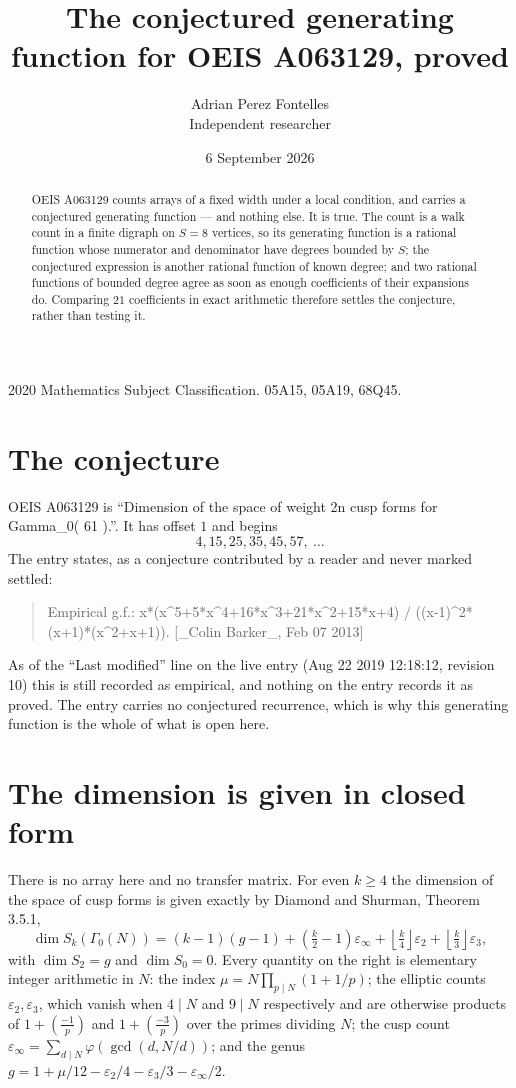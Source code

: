 \documentclass[11pt,a4paper]{article}
\title{The conjectured generating function for OEIS A063129, proved}
\author{Adrian Perez Fontelles\\ \small Independent researcher}
\date{6 September 2026}
\theoremstyle{plain}
\theoremstyle{definition}
\begin{document}
\maketitle

\begin{abstract}
OEIS A063129 counts arrays of a fixed width under a local condition, and carries a conjectured
generating function --- and nothing else. It is true. The count is a walk count in a finite
digraph on $S=8$ vertices, so its generating function is a rational function whose numerator
and denominator have degrees bounded by $S$; the conjectured expression is another rational
function of known degree; and two rational functions of bounded degree agree as soon as enough
coefficients of their expansions do. Comparing $21$ coefficients in exact arithmetic
therefore settles the conjecture, rather than testing it.
\end{abstract}

\noindent\small 2020 Mathematics Subject Classification. 05A15, 05A19, 68Q45.\normalsize

\section{The conjecture}

OEIS A063129 is ``Dimension of the space of weight 2n cusp forms for Gamma\_0( 61 ).''. It has offset $1$ and begins
\[
4, 15, 25, 35, 45, 57,\ \dots
\]
The entry states, as a conjecture contributed by a reader and never marked settled:
\begin{quote}
Empirical g.f.: x*(x\^{}5+5*x\^{}4+16*x\^{}3+21*x\^{}2+15*x+4) / ((x-1)\^{}2*(x+1)*(x\^{}2+x+1)). [\_Colin Barker\_, Feb 07 2013]
\end{quote}
As of the ``Last modified'' line on the live entry (Aug 22 2019 12:18:12, revision 10) this is still
recorded as empirical, and nothing on the entry records it as proved. The entry carries no
conjectured recurrence, which is why this generating function is the whole of what is open
here.


\section{The dimension is given in closed form}

There is no array here and no transfer matrix. For even $k\ge4$ the dimension of the space of
cusp forms is given exactly by Diamond and Shurman, Theorem 3.5.1,
\[
\dim S_k(\Gamma_0(N))=(k-1)(g-1)+\left(\tfrac{k}{2}-1\right)\varepsilon_\infty
+\left\lfloor\tfrac{k}{4}\right\rfloor\varepsilon_2
+\left\lfloor\tfrac{k}{3}\right\rfloor\varepsilon_3 ,
\]
with $\dim S_2=g$ and $\dim S_0=0$. Every quantity on the right is elementary integer
arithmetic in $N$: the index $\mu=N\prod_{p\mid N}(1+1/p)$; the elliptic counts
$\varepsilon_2,\varepsilon_3$, which vanish when $4\mid N$ and $9\mid N$ respectively and are
otherwise products of $1+\left(\frac{-1}{p}\right)$ and $1+\left(\frac{-3}{p}\right)$
over the primes dividing $N$; the cusp count
$\varepsilon_\infty=\sum_{d\mid N}\varphi(\gcd(d,N/d))$; and the genus
$g=1+\mu/12-\varepsilon_2/4-\varepsilon_3/3-\varepsilon_\infty/2$.
\end{document}
